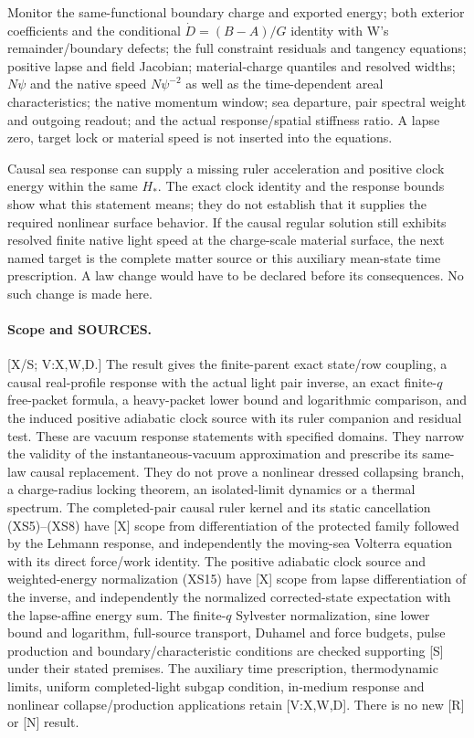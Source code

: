 \documentclass[11pt]{article}
\begin{document}
Monitor the same-functional boundary charge and exported
energy; both exterior coefficients and the conditional
$\dot D=(B-A)/G$ identity with W's remainder/boundary defects;
the full constraint residuals and tangency equations;
positive lapse and field Jacobian; material-charge quantiles
and resolved widths; $N\psi$ and the native speed
$N\psi^{-2}$ as well as the time-dependent areal characteristics;
the native momentum window; sea departure, pair spectral
weight and outgoing readout; and the actual response/spatial
stiffness ratio.  A lapse zero, target lock or material speed
is not inserted into the equations.

Causal sea response can supply a missing ruler acceleration
and positive clock energy within the same $H_*$.  The exact
clock identity and the response bounds show what this
statement means; they do not establish that it supplies the
required nonlinear surface behavior.  If the causal regular
solution still exhibits resolved finite native light speed
at the charge-scale material surface, the next named target
is the complete matter source or this auxiliary mean-state
time prescription.  A law change would have to be declared
before its consequences.  No such change is made here.

\paragraph{Scope and SOURCES.}
[X/S; V:X,W,D.]  The result gives the finite-parent exact
state/row coupling, a causal real-profile response with the
actual light pair inverse, an exact finite-$q$ free-packet
formula, a heavy-packet lower bound and logarithmic comparison,
and the induced positive adiabatic clock source with its
ruler companion and residual test.  These are vacuum response
statements with specified domains.  They narrow the validity
of the instantaneous-vacuum approximation and prescribe its
same-law causal replacement.  They do not prove a nonlinear
dressed collapsing branch, a charge-radius locking theorem,
an isolated-limit dynamics or a thermal spectrum.
The completed-pair causal ruler kernel and its static
cancellation (XS5)--(XS8) have [X] scope from differentiation
of the protected family followed by the Lehmann response,
and independently the moving-sea Volterra equation with its
direct force/work identity.
The positive adiabatic clock source and weighted-energy
normalization (XS15) have [X] scope from lapse differentiation
of the inverse, and independently the normalized corrected-state
expectation with the lapse-affine energy sum.
The finite-$q$ Sylvester normalization, sine lower bound and
logarithm, full-source transport, Duhamel and force budgets,
pulse production and boundary/characteristic conditions are
checked supporting [S] under their stated premises.
The auxiliary time prescription, thermodynamic limits,
uniform completed-light subgap condition, in-medium response
and nonlinear collapse/production applications retain
[V:X,W,D].  There is no new [R] or [N] result.
\end{document}
